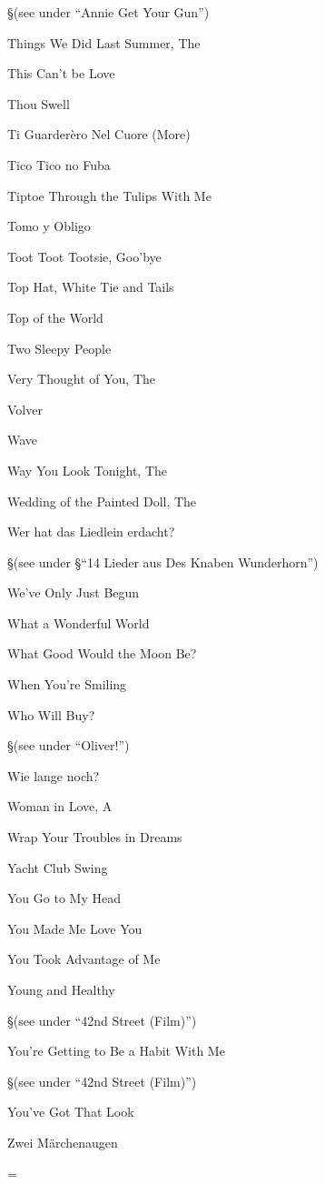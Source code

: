 \nobreak
\S (see under ``Annie Get Your Gun'')

\N Things We Did Last Summer, The


\N This Can't be Love


\N Thou Swell


\N Ti Guarder{\`e}ro Nel Cuore (More)


\N Tico Tico no Fuba


\N Tiptoe Through the Tulips With Me


\N Tomo y Obligo


\N Toot Toot Tootsie, Goo'bye


\N Top Hat, White Tie and Tails


\N Top of the World


\N Two Sleepy People


\N Very Thought of You, The


\N Volver


\N Wave


\N Way You Look Tonight, The


\N Wedding of the Painted Doll, The


\N Wer hat das Liedlein erdacht?

\nobreak
\S (see under
\S ``14 Lieder aus Des Knaben Wunderhorn'')

\N We've Only Just Begun


\N What a Wonderful World


\N What Good Would the Moon Be?


\N When You're Smiling


\N Who Will Buy?

\nobreak
\S (see under ``Oliver!'')

\N Wie lange noch?


\N Woman in Love, A


\N Wrap Your Troubles in Dreams


\N Yacht Club Swing


\N You Go to My Head


\N You Made Me Love You


\N You Took Advantage of Me


\N Young and Healthy

\nobreak
\S (see under ``42nd Street (Film)'')

\N You're Getting to Be a Habit With Me

\nobreak
\S (see under ``42nd Street (Film)'')

\N You've Got That Look


\N Zwei M{\"a}rchenaugen


\singlecolumn
\vfil\eject
\pagecnt=\pageno
\endinput

